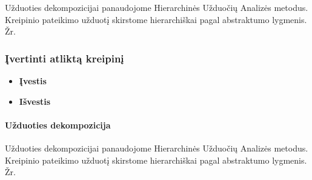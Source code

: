 
	Užduoties dekompozicijai panaudojome Hierarchinės Užduočių Analizės metodus.
	Kreipinio pateikimo užduotį skirstome hierarchiškai pagal abstraktumo lygmenis. 
	Žr. 
	
	\subsubsection{Įvertinti atliktą kreipinį}
		
		\begin{itemize}
			\item \textbf{Įvestis}
			\item \textbf{Išvestis} 
		\end{itemize}


	\paragraph{Užduoties dekompozicija}


	Užduoties dekompozicijai panaudojome Hierarchinės Užduočių Analizės metodus.
	Kreipinio pateikimo užduotį skirstome hierarchiškai pagal abstraktumo lygmenis. 
	Žr. 

